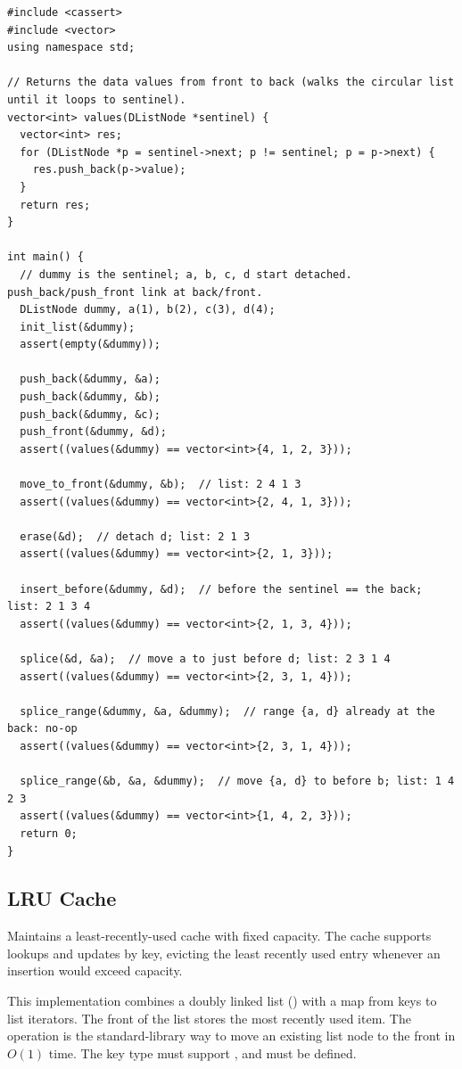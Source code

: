 \begin{lstlisting}[style=cpp]
#include <cassert>
#include <vector>
using namespace std;

// Returns the data values from front to back (walks the circular list until it loops to sentinel).
vector<int> values(DListNode *sentinel) {
  vector<int> res;
  for (DListNode *p = sentinel->next; p != sentinel; p = p->next) {
    res.push_back(p->value);
  }
  return res;
}

int main() {
  // dummy is the sentinel; a, b, c, d start detached. push_back/push_front link at back/front.
  DListNode dummy, a(1), b(2), c(3), d(4);
  init_list(&dummy);
  assert(empty(&dummy));

  push_back(&dummy, &a);
  push_back(&dummy, &b);
  push_back(&dummy, &c);
  push_front(&dummy, &d);
  assert((values(&dummy) == vector<int>{4, 1, 2, 3}));

  move_to_front(&dummy, &b);  // list: 2 4 1 3
  assert((values(&dummy) == vector<int>{2, 4, 1, 3}));

  erase(&d);  // detach d; list: 2 1 3
  assert((values(&dummy) == vector<int>{2, 1, 3}));

  insert_before(&dummy, &d);  // before the sentinel == the back; list: 2 1 3 4
  assert((values(&dummy) == vector<int>{2, 1, 3, 4}));

  splice(&d, &a);  // move a to just before d; list: 2 3 1 4
  assert((values(&dummy) == vector<int>{2, 3, 1, 4}));

  splice_range(&dummy, &a, &dummy);  // range {a, d} already at the back: no-op
  assert((values(&dummy) == vector<int>{2, 3, 1, 4}));

  splice_range(&b, &a, &dummy);  // move {a, d} to before b; list: 1 4 2 3
  assert((values(&dummy) == vector<int>{1, 4, 2, 3}));
  return 0;
}
\end{lstlisting}
\subsection{LRU Cache}
\label{sec:2.1.3}
Maintains a least-recently-used cache with fixed capacity. The cache supports lookups and updates by key, evicting the least recently used entry whenever an insertion would exceed capacity.

This implementation combines a doubly linked list () with a map from keys to list iterators. The front of the list stores the most recently used item. The operation  is the standard-library way to move an existing list node to the front in $O(1)$ time. The key type  must support , and  must be defined.

